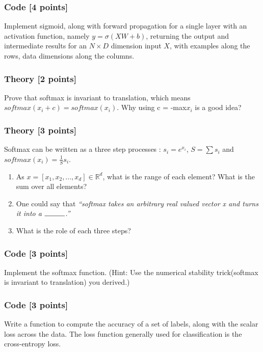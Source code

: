 \documentclass[a4 paper]{article}
\numberwithin{equation}{section}
\newcommand{\0}{\mathbf{0}}
\begin{document}
        \subsubsection{Code [4 points]} Implement sigmoid, along with forward propagation for a single layer with an activation function, namely $y = \sigma(XW + b)$, returning the output and intermediate results for an $N \times D$ dimension input $X$, with examples along the rows, data dimensions along the columns.
        
        \subsubsection{Theory [2 points]}
        Prove that softmax is invariant to translation, which means $softmax(x_i + c) = softmax(x_i)$. Why using c = -max$x_i$ is a good idea?
        
        \subsubsection{Theory [3 points]}
        Softmax can be written as a three step processes : $s_i = e^{x_i}$, $S = \sum s_i$ and $softmax(x_i) = \frac{1}{S}s_i$.
        \begin{enumerate}
            \item As $x  = [x_1, x_2, ... , x_d]\in \mathbb{R}^d$, what is the range of each element? What is the sum over all elements?\\
            \item One could say that \emph{``softmax takes an arbitrary real valued vector x and turns it into a $\rule{1cm}{0.15mm}$.''}\\
            \item What is the role of each three steps?\\
        \end{enumerate}
        
        \subsubsection{Code [3 points]}
        Implement the softmax function. (Hint: Use the numerical stability trick(softmax is invariant to translation) you derived.)

        \subsubsection{Code [3 points]} Write a function to compute the accuracy of a set of labels, along with the scalar loss across the data. The loss function generally used for classification is the cross-entropy loss.
        
\end{document}
